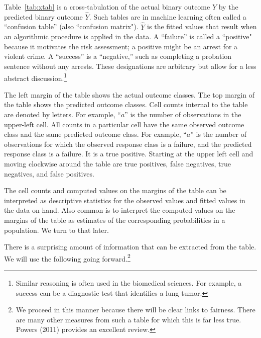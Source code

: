 \documentclass[12pt]{article}
\begin{document}
Table~\ref{tab:xtab} is a cross-tabulation of the actual binary outcome $Y$ by the predicted binary outcome $\hat{Y}$.  Such tables are in machine learning often called a ``confusion table'' (also ``confusion matrix"). $\hat{Y}$ is the fitted values that result when an algorithmic procedure is applied in the data.  A ``failure'' is called a ``positive" because it motivates the risk assessment; a positive might be an arrest for a violent crime. A ``success'' is a ``negative,'' such as completing a probation sentence without any arrests.  These designations are arbitrary but allow for a less abstract discussion.\footnote
{
Similar reasoning is often used in the biomedical sciences. For example, a success can be a diagnostic test that identifies a lung tumor.
}

The left margin of the table shows the actual outcome classes. The top margin of the table shows the predicted outcome classes. Cell counts internal to the table are denoted by letters. For example, ``$a$'' is the number of observations in the upper-left cell.  All counts in a particular cell have the same observed outcome class and the same predicted outcome class. For example, ``$a$'' is the number of observations for which the observed response class is a failure, and the predicted response class is a failure. It is a true positive. Starting at the upper left cell and moving clockwise around the table are true positives, false negatives, true negatives, and false positives.
 
The cell counts and computed values on the margins of the table can be interpreted as descriptive statistics for the observed values and fitted values in the data on hand. Also common is to interpret the computed values on the margins of the table as estimates of the corresponding probabilities in a population. We turn to that later. 

There is a surprising amount of information that can be extracted from the table. We will use the following going forward.\footnote
{
We proceed in this manner because there will be clear links to fairness. There are many other measures from such a table for which this is far less true. Powers (2011) provides an excellent review. 
}
\end{document}
